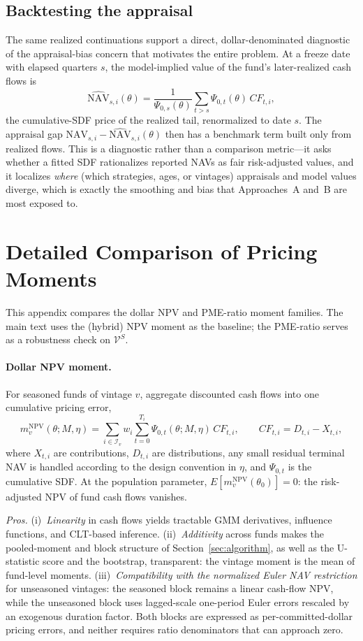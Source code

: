 \documentclass[11pt]{article}
\begin{document}
\subsection{Backtesting the appraisal}
\label{app:backtest}

The same realized continuations support a direct, dollar-denominated diagnostic of the appraisal-bias concern that motivates the entire problem. At a freeze date with elapsed quarters \(s\), the model-implied value of the fund's later-realized cash flows is
\[
\widehat{\mathrm{NAV}}_{s,i}(\theta)
=
\frac{1}{\Psi_{0,s}(\theta)}\sum_{t>s}\Psi_{0,t}(\theta)\,CF_{t,i},
\]
the cumulative-SDF price of the realized tail, renormalized to date \(s\). The appraisal gap \(\mathrm{NAV}_{s,i}-\widehat{\mathrm{NAV}}_{s,i}(\theta)\) then has a benchmark term built only from realized flows. This is a diagnostic rather than a comparison metric---it asks whether a fitted SDF rationalizes reported NAVs as fair risk-adjusted values, and it localizes \emph{where} (which strategies, ages, or vintages) appraisals and model values diverge, which is exactly the smoothing and bias that Approaches~A and~B are most exposed to.

\section{Detailed Comparison of Pricing Moments}
\label{app:moment_details}

This appendix compares the dollar NPV and PME-ratio moment families. The main text uses the (hybrid) NPV moment as the baseline; the PME-ratio serves as a robustness check on \(\mathcal V^S\).

\paragraph{Dollar NPV moment.}
For seasoned funds of vintage \(v\), aggregate discounted cash flows into one
cumulative pricing error,
\[
m^{\mathrm{NPV}}_{v}(\theta;M,\eta)
=\sum_{i\in \mathcal I_v} w_i\sum_{t=0}^{T_i}\Psi_{0,t}(\theta;M,\eta)\,CF_{t,i},
\qquad CF_{t,i}=D_{t,i}-X_{t,i},
\]
where \(X_{t,i}\) are contributions, \(D_{t,i}\) are distributions, any small
residual terminal NAV is handled according to the design convention in
\(\eta\), and \(\Psi_{0,t}\) is the cumulative SDF. At
the population parameter, \(E[m^{\mathrm{NPV}}_{v}(\theta_0)]=0\): the
risk-adjusted NPV of fund cash flows vanishes.

\emph{Pros.}
(i)~\emph{Linearity} in cash flows yields tractable GMM derivatives,
influence functions, and CLT-based inference.
(ii)~\emph{Additivity} across funds makes the pooled-moment and block
structure of Section~\ref{sec:algorithm}, as well as the U-statistic score
and the bootstrap, transparent: the vintage moment is the mean of fund-level
moments.
(iii)~\emph{Compatibility with the normalized Euler NAV restriction} for
unseasoned vintages: the seasoned block remains a linear cash-flow NPV,
while the unseasoned block uses lagged-scale one-period Euler errors rescaled
by an exogenous duration factor. Both blocks are expressed as per-committed-dollar
pricing errors, and neither requires ratio denominators that can approach zero.
\end{document}
